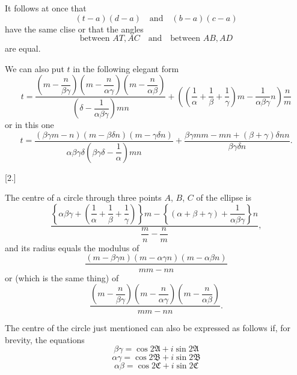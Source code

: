 
It follows at once that
\[
(t-a)(d-a) \quad \text{and} \quad (b-a)(c-a)
\]
have the same clise or that the angles
\[
\text{between } AT, AC \quad \text{and} \quad \text{between } AB, AD
\]
are equal.

We can also put $t$ in the following elegant form
\[
t = \dfrac{\left(m-\dfrac{n}{\beta\gamma}\right)
  \left(m-\dfrac{n}{\alpha\gamma}\right)
  \left(m-\dfrac{n}{\alpha\beta}\right)}
  {\left(\delta - \dfrac{1}{\alpha\beta\gamma}\right) m n}
  + \left(\left(\dfrac{1}{\alpha}+\dfrac{1}{\beta}+\dfrac{1}{\gamma}\right) m
  - \dfrac{1}{\alpha\beta\gamma} n\right) \dfrac{n}{m}
\]
or in this one
\[
t = \dfrac{(\beta\gamma m - n)(m - \beta\delta n)(m-\gamma\delta n)}
  {\alpha\beta\gamma\delta\left(\beta\gamma\delta - \dfrac{1}{\alpha}\right) m n}
  + \dfrac{\beta\gamma m m - m n + (\beta+\gamma)\delta n n}{\beta\gamma\delta n}.
\]

\begin{center}
[2.]
\end{center}

The centre of a circle through three points $A$, $B$, $C$ of the ellipse
is
\[
\dfrac{\left\{\alpha\beta\gamma +
  \left(\dfrac{1}{\alpha}+\dfrac{1}{\beta}+\dfrac{1}{\gamma}\right)\right\} m
  - \left\{(\alpha+\beta+\gamma) + \dfrac{1}{\alpha\beta\gamma}\right\} n}
  {\dfrac{m}{n} - \dfrac{n}{m}},
\]
and its radius equals the modulus of \[
\dfrac{(m-\beta\gamma n)(m-\alpha\gamma n)(m-\alpha\beta n)}{mm - nn}
\]
or (which is the same thing) of
\[
\dfrac{\left(m-\dfrac{n}{\beta\gamma}\right)\left(m-\dfrac{n}{\alpha\gamma}\right)
  \left(m-\dfrac{n}{\alpha\beta}\right)}{mm-nn}.
\]

The centre of the circle just mentioned can also be expressed as follows if, for
brevity, the equations
\[
\beta\gamma = \cos 2\mathfrak{A} + i\sin 2\mathfrak{A}
\]
\[
\alpha\gamma = \cos 2\mathfrak{B} + i\sin 2\mathfrak{B}
\]
\[
\alpha\beta = \cos 2\mathfrak{C} + i\sin 2\mathfrak{C}
\]%
